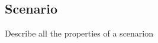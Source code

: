 \cbstart

\subsection{Scenario}
\label{sec:formal scenario}

\color{red}

Describe all the properties of a scenarion

\color{black}

\cbend